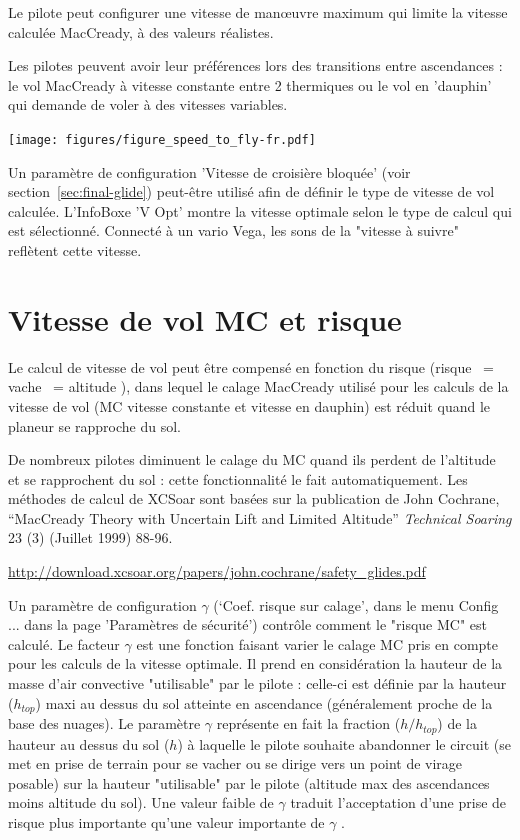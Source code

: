 Le pilote peut configurer une vitesse de manœuvre maximum qui limite la vitesse calculée MacCready, à des valeurs réalistes.

Les pilotes peuvent avoir leur préférences lors des transitions entre ascendances : le vol MacCready à vitesse constante entre 2 thermiques ou le vol en 'dauphin' qui demande de voler à des vitesses variables.

\begin{center}
\texttt{[image: figures/figure\_speed\_to\_fly-fr.pdf]}
\end{center}

Un paramètre de configuration 'Vitesse de croisière bloquée' (voir section~\ref{sec:final-glide}) peut-être utilisé afin de définir le type de vitesse de vol calculée. L'InfoBoxe 'V Opt' montre la vitesse optimale selon le type de calcul qui est sélectionné. Connecté à un vario Vega, les sons de la "vitesse à suivre"  reflètent cette vitesse.  

\section{Vitesse de vol MC et risque}\label{sec:speed-fly-with}
Le calcul de vitesse de vol peut être compensé en fonction du risque (risque ~= vache  ~= altitude ), dans lequel le calage MacCready utilisé pour les calculs de la vitesse de vol (MC vitesse constante et vitesse en dauphin) est réduit quand le planeur se rapproche du sol.

De nombreux pilotes diminuent le calage du MC quand ils perdent de l'altitude et se rapprochent du sol : cette fonctionnalité le fait automatiquement. Les méthodes de calcul de XCSoar sont basées sur la publication de John  Cochrane, ``MacCready Theory with Uncertain Lift and Limited  Altitude'' {\em Technical Soaring} 23 (3) (Juillet 1999) 88-96.

\url{http://download.xcsoar.org/papers/john.cochrane/safety_glides.pdf}

Un paramètre de configuration $\gamma$ (`Coef. risque sur calage', dans le menu Config ... dans la page 'Paramètres de sécurité')  contrôle comment le "risque MC" est calculé. Le facteur $\gamma$ est une fonction faisant varier le calage MC pris en compte pour les calculs de la vitesse optimale. Il prend en considération la hauteur de la masse d'air convective "utilisable" par le pilote : celle-ci est définie par la hauteur ($h_{top}$) maxi au dessus du sol atteinte en ascendance (généralement proche de la base des nuages). Le paramètre $\gamma$ représente en fait la fraction ($h/h_{top}$) de la hauteur au dessus du sol  ($h$) à laquelle le pilote souhaite abandonner le circuit (se met en prise de terrain pour se vacher ou se dirige vers un point de virage posable) sur la hauteur "utilisable" par le pilote (altitude max des ascendances moins altitude du sol). Une valeur faible de $\gamma$  traduit l'acceptation d'une prise de risque plus importante qu'une valeur importante de  $\gamma$ . 

